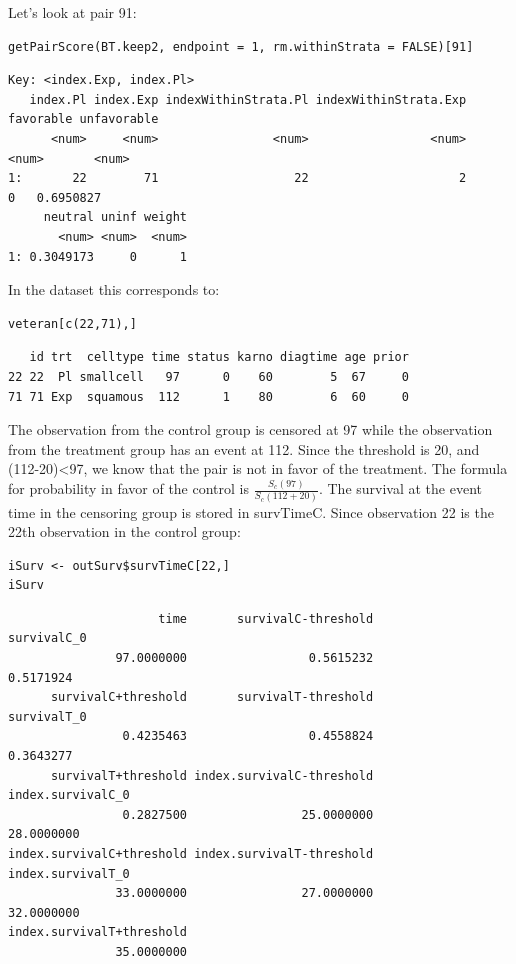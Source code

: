 \documentclass[12pt]{article}
\begin{document}
Let's look at pair 91:
\lstset{language=r,label= ,caption= ,captionpos=b,numbers=none}
\begin{lstlisting}
getPairScore(BT.keep2, endpoint = 1, rm.withinStrata = FALSE)[91]
\end{lstlisting}

\begin{verbatim}
Key: <index.Exp, index.Pl>
   index.Pl index.Exp indexWithinStrata.Pl indexWithinStrata.Exp favorable unfavorable
      <num>     <num>                <num>                 <num>     <num>       <num>
1:       22        71                   22                     2         0   0.6950827
     neutral uninf weight
       <num> <num>  <num>
1: 0.3049173     0      1
\end{verbatim}


In the dataset this corresponds to:
\lstset{language=r,label= ,caption= ,captionpos=b,numbers=none}
\begin{lstlisting}
veteran[c(22,71),]
\end{lstlisting}

\begin{verbatim}
   id trt  celltype time status karno diagtime age prior
22 22  Pl smallcell   97      0    60        5  67     0
71 71 Exp  squamous  112      1    80        6  60     0
\end{verbatim}


The observation from the control group is censored at 97 while the
observation from the treatment group has an event at 112. Since the
threshold is 20, and (112-20)<97, we know that the pair is not in
favor of the treatment. The formula for probability in favor of the
control is \(\frac{S_c(97)}{S_c(112+20)}\). The survival at the event
time in the censoring group is stored in survTimeC. Since observation
22 is the 22th observation in the control group:
\lstset{language=r,label= ,caption= ,captionpos=b,numbers=none}
\begin{lstlisting}
iSurv <- outSurv$survTimeC[22,] 
iSurv
\end{lstlisting}

\begin{verbatim}
                     time       survivalC-threshold               survivalC_0 
               97.0000000                 0.5615232                 0.5171924 
      survivalC+threshold       survivalT-threshold               survivalT_0 
                0.4235463                 0.4558824                 0.3643277 
      survivalT+threshold index.survivalC-threshold         index.survivalC_0 
                0.2827500                25.0000000                28.0000000 
index.survivalC+threshold index.survivalT-threshold         index.survivalT_0 
               33.0000000                27.0000000                32.0000000 
index.survivalT+threshold 
               35.0000000
\end{verbatim}
\end{document}
